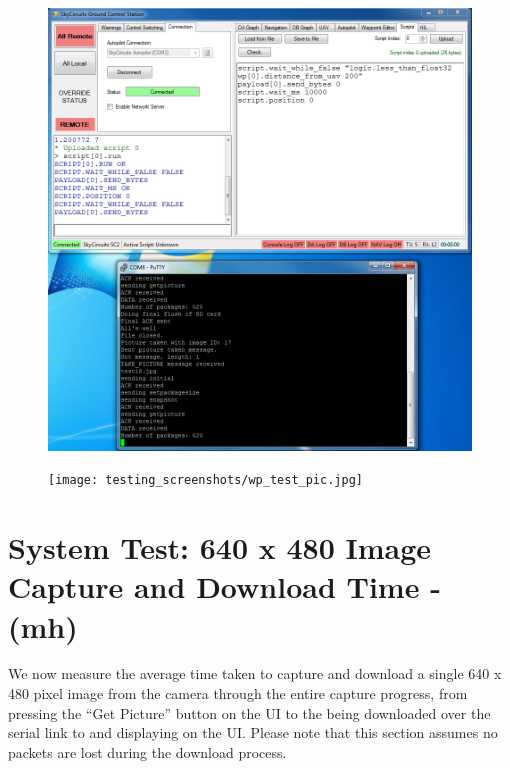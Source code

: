 \begin{figure}[H]
        \centering
        \includegraphics[width=1.0\textwidth]{testing_screenshots/wp_test.png}
        \label{fig:test_wp}
\end{figure}

\begin{figure}[H]
        \centering
        \texttt{[image: testing\_screenshots/wp\_test\_pic.jpg]}
        \label{fig:test_wp_pic}
\end{figure}

\section{System Test: 640 x 480 Image Capture and Download Time - (mh)}
\label{sec:sys_testing}

We now measure the average time taken to capture and download a single 640 x 480
pixel image from the camera through the entire capture progress, from pressing the 
``Get Picture'' button on the UI to the being downloaded over the serial link to and
displaying on the UI. Please note that this section assumes no packets are lost during
the download process.

